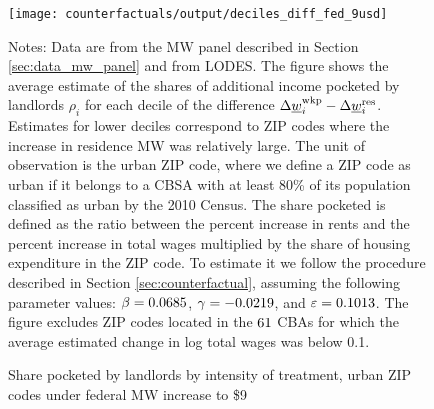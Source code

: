 \begin{figure}[h!]
    \centering
    \caption{Share pocketed by landlords by intensity of treatment, 
             urban ZIP codes under federal MW increase to \$9}
    \label{fig:rho_by_decile_MW_gap}

	\texttt{[image: counterfactuals/output/deciles\_diff\_fed\_9usd]}

    \begin{minipage}{.95\textwidth} \footnotesize
        \vspace{3mm}
        Notes:
        Data are from the MW panel described in Section \ref{sec:data_mw_panel} 
        and from LODES.
        The figure shows the average estimate of the shares of additional
        income pocketed by landlords $\rho_i$ for each decile of the 
        difference $\Delta \underline{w}_i^{\text{wkp}} - \Delta \underline{w}_i^{\text{res}}$.
        Estimates for lower deciles correspond to ZIP codes where the increase 
        in residence MW was relatively large.
        The unit of observation is the urban ZIP code, where we define a ZIP code 
        as urban if it belongs to a CBSA with at least 80\% of its population 
        classified as urban by the 2010 Census.
        The share pocketed is defined as the ratio between the percent increase 
        in rents and the percent increase in total wages multiplied by the share 
        of housing expenditure in the ZIP code.
        To estimate it we follow the procedure described in Section 
        \ref{sec:counterfactual}, assuming the following parameter values: 
        $\beta = 0.0685$, $\gamma = -0.0219$, and $\varepsilon = 0.1013$.
        The figure excludes ZIP codes located in the $\textnormal{61}$ CBAs for 
        which the average estimated change in log total wages was below 0.1.
    \end{minipage}
\end{figure}
